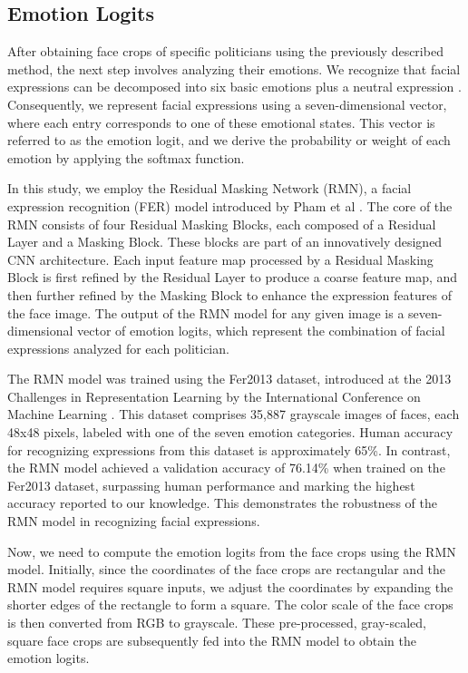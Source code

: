 \documentclass[sigconf]{acmart}
\begin{document}
\subsection{Emotion Logits}

After obtaining face crops of specific politicians using the previously described method, the next step involves analyzing their emotions. We recognize that facial expressions can be decomposed into six basic emotions plus a neutral expression \cite{compoundemotion}. Consequently, we represent facial expressions using a seven-dimensional vector, where each entry corresponds to one of these emotional states. This vector is referred to as the emotion logit, and we derive the probability or weight of each emotion by applying the softmax function.

In this study, we employ the Residual Masking Network (RMN), a facial expression recognition (FER) model introduced by Pham et al \cite{rmn}. The core of the RMN consists of four Residual Masking Blocks, each composed of a Residual Layer and a Masking Block. These blocks are part of an innovatively designed CNN architecture. Each input feature map processed by a Residual Masking Block is first refined by the Residual Layer to produce a coarse feature map, and then further refined by the Masking Block to enhance the expression features of the face image. The output of the RMN model for any given image is a seven-dimensional vector of emotion logits, which represent the combination of facial expressions analyzed for each politician.

The RMN model was trained using the Fer2013 dataset, introduced at the 2013 Challenges in Representation Learning by the International Conference on Machine Learning \cite{fer2013}. This dataset comprises 35,887 grayscale images of faces, each 48x48 pixels, labeled with one of the seven emotion categories. Human accuracy for recognizing expressions from this dataset is approximately 65\%. In contrast, the RMN model achieved a validation accuracy of 76.14\% when trained on the Fer2013 dataset, surpassing human performance and marking the highest accuracy reported to our knowledge. This demonstrates the robustness of the RMN model in recognizing facial expressions.

Now, we need to compute the emotion logits from the face crops using the RMN model. Initially, since the coordinates of the face crops are rectangular and the RMN model requires square inputs, we adjust the coordinates by expanding the shorter edges of the rectangle to form a square. The color scale of the face crops is then converted from RGB to grayscale. These pre-processed, gray-scaled, square face crops are subsequently fed into the RMN model to obtain the emotion logits.
\end{document}

